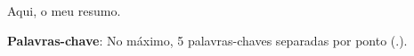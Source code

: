 %
%

\begin{resumo}

Aqui, o meu resumo.

\textbf{Palavras-chave}: No máximo, 5 palavras-chaves separadas por ponto (.).

\end{resumo}
